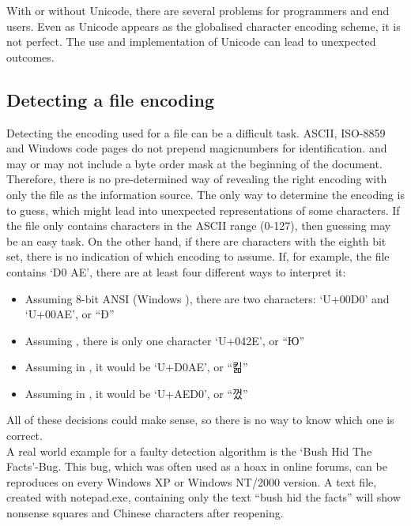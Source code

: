 \documentclass[a4paper, 12pt]{scrartcl} %
\begin{document}
With or without Unicode, there are several problems for programmers and end
users. Even as Unicode appears as the globalised character encoding scheme, it
is not perfect. The use and implementation of Unicode can lead to unexpected
outcomes.

\subsection{Detecting a file encoding}

Detecting the encoding used for a file can be a difficult task. \gls{ASCII},
\gls{ISO-8859} and Windows code pages do not prepend \glspl{magicnumber}
for identification.  and  may or may
not include a byte order mask at the beginning of the document.  Therefore,
there is no pre-determined way of revealing the right encoding with only the
file as the information source. The only way to determine the encoding is to
guess, which might lead into unexpected representations of some characters. If
the file only contains characters in the \gls{ASCII} range (0-127), then
guessing may be an easy task. On the other hand, if there are characters with
the eighth bit set, there is no indication of which encoding to assume. If, for
example, the file contains `D0 AE', there are at least four different ways to
interpret it:

\begin{itemize}
  \item Assuming 8-bit \gls{ANSI} (Windows ), there are two
    characters: `U+00D0' and `U+00AE', or ``Đ\textregistered''
  \item Assuming , there is only one character `U+042E', or
    ``{\droid Ю}''
  \item Assuming  in , it
    would be `U+D0AE', or ``{\droid 킮}''
  \item Assuming  in ,
    it would be `U+AED0', or ``{\droid 껐}''
\end{itemize}
All of these decisions could make sense, so there is no way to know which one
is correct. \cite{notepadproblem} \\
A real world example for a faulty detection algorithm is the `Bush Hid The
Facts'-Bug. This bug, which was often used as a hoax in online forums, can be
reproduces on every Windows XP or Windows NT/2000 version. A text file, created
with notepad.exe, containing only the text ``bush hid the facts'' will show
nonsense squares and Chinese characters after reopening. \cite{bushhidthefacts}
\end{document}
